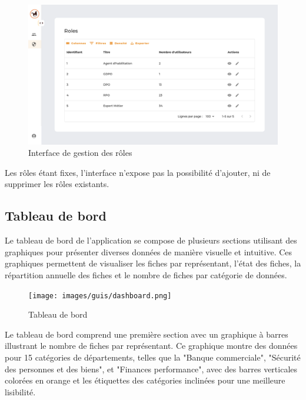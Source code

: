 \begin{figure}[H]
    \centering
    \includegraphics[width=\textwidth]{images/guis/roles.png}
    \caption{Interface de gestion des rôles}
\end{figure}

\noindent Les rôles étant fixes, l'interface n'expose pas la possibilité d'ajouter, ni de supprimer les rôles existants.

\clearpage

\subsection{Tableau de bord}

Le tableau de bord de l'application se compose de plusieurs sections utilisant des graphiques pour présenter diverses données de manière visuelle et intuitive. Ces graphiques permettent de visualiser les fiches par représentant, l'état des fiches, la répartition annuelle des fiches et le nombre de fiches par catégorie de données. \\

\begin{figure}[H]
    \centering
    \texttt{[image: images/guis/dashboard.png]}
    \caption{Tableau de bord}
\end{figure}


\noindent Le tableau de bord comprend une première section avec un graphique à barres illustrant le nombre de fiches par représentant. Ce graphique montre des données pour 15 catégories de départements, telles que la "Banque commerciale", "Sécurité des personnes et des biens", et "Finances performance", avec des barres verticales colorées en orange et les étiquettes des catégories inclinées pour une meilleure lisibilité.

